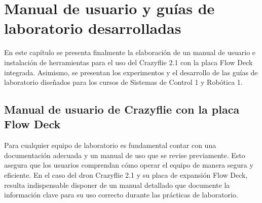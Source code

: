 
\chapter{Manual de usuario y guías de laboratorio desarrolladas}
En este capítulo se presenta finalmente la elaboración de un manual de usuario e instalación de herramientas para el uso del Crazyflie 2.1 con la placa Flow Deck integrada. Asimismo, se presentan los experimentos y el desarrollo de las guías de laboratorio diseñados para los cursos de Sistemas de Control 1 y Robótica 1.

\section{Manual de usuario de Crazyflie con la placa Flow Deck}
Para cualquier equipo de laboratorio es fundamental contar con una documentación adecuada y un manual de uso que se revise previamente. Esto asegura que los usuarios comprendan cómo operar el equipo de manera segura y eficiente. En el caso del dron Crazyflie 2.1 y su placa de expansión Flow Deck, resulta indispensable disponer de un manual detallado que documente la información clave para su uso correcto durante las prácticas de laboratorio.

